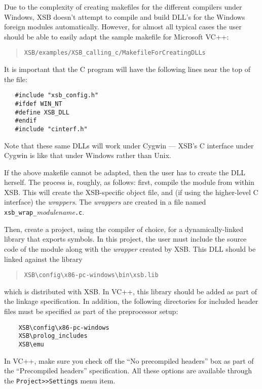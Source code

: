 Due to the complexity of creating makefiles for the different compilers
under Windows, XSB doesn't attempt to compile and build DLL's for the
Windows foreign modules automatically. However, for almost all typical
cases the user should be able to easily adapt the sample makefile for
Microsoft VC++:
\begin{quote}
 {\tt XSB/examples/XSB\_calling\_c/MakefileForCreatingDLLs}
\end{quote}
It is important that the C program will have the following lines near the
top of the file:
\begin{verbatim}
   #include "xsb_config.h"  
   #ifdef WIN_NT
   #define XSB_DLL
   #endif
   #include "cinterf.h"
\end{verbatim}

Note that these same DLLs will work under Cygwin --- XSB's C interface
under Cygwin is like that under Windows rather than Unix.


If the above makefile cannot be adapted, then the user has to create
the DLL herself.  The process is, roughly, as follows: first, compile
the module from within XSB.  This will create the XSB-specific object
file, and (if using the higher-level C interface) the
\emph{wrappers}. The \emph{wrappers} are created in a file named
\texttt{xsb\_wrap\_}\emph{modulename}\texttt{.c}.

Then, create a project, using the compiler of choice, for a
dynamically-linked library that exports symbols. In this project, the
user must include the source code of the module along with the
\emph{wrapper} created by XSB. This DLL should be linked against the
library
\begin{quote}
   \verb|XSB\config\x86-pc-windows\bin\xsb.lib|
\end{quote}
which is distributed with XSB. In VC++, this library should be added 
as part of the linkage specification. In addition, the following
directories for included header files must be specified as part of the
preprocessor setup:
\begin{verbatim}
    XSB\config\x86-pc-windows
    XSB\prolog_includes
    XSB\emu
\end{verbatim}
In VC++, make sure you check off the ``No precompiled headers'' box as part
of the ``Precompiled headers'' specification. All these options are
available through the {\tt Project>>Settings} menu item.



